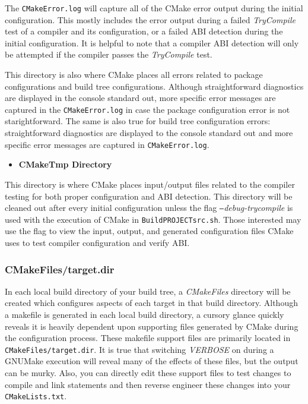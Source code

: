 \documentclass[12pt,letterpaper]{article}
\begin{document}
The \verb|CMakeError.log| will capture all of the CMake error output during the initial configuration.  This mostly includes the error output during a failed \emph{TryCompile} test of a compiler and its configuration, or a failed ABI detection during the initial configuration.  It is helpful to note that a compiler ABI detection will only be attempted if the compiler passes the \emph{TryCompile} test.

This directory is also where CMake places all errors related to package configurations and build tree configurations.  Although straightforward diagnostics are displayed in the console standard out, more specific error messages are captured in the \verb|CMakeError.log| in case the package configuration error is not starightforward.  The same is also true for build tree configuration errors: straightforward diagnostics are displayed to the console standard out and more specific error messages are captured in \verb|CMakeError.log|.

\begin{itemize}
\item \textbf{CMakeTmp Directory}
\end{itemize}

This directory is where CMake places input/output files related to the compiler testing for both proper configuration and ABI detection.  This directory will be cleaned out after every initial configuration unless the flag \emph{\texttt{--}debug-trycompile} is used with the execution of CMake in \verb|BuildPROJECTsrc.sh|.  Those interested may use the flag to view the input, output, and generated configuration files CMake uses to test compiler configuration and verify ABI.

\subsubsection{CMakeFiles/target.dir}

In each local build directory of your build tree, a \emph{CMakeFiles} directory will be created which configures aspects of each target in that build directory.  Although a makefile is generated in each local build directory, a cursory glance quickly reveals it is heavily dependent upon supporting files generated by CMake during the configuration process.  These makefile support files are primarily located in \verb|CMakeFiles/target.dir|.  It is true that switching \emph{VERBOSE} on during a GNUMake execution will reveal many of the effects of these files, but the output can be murky.  Also, you can directly edit these support files to test changes to compile and link statements and then reverse engineer these changes into your \verb|CMakeLists.txt|.
\end{document}
